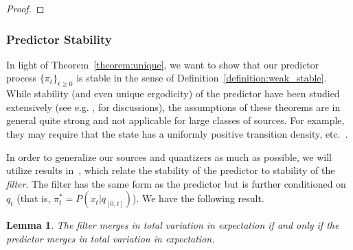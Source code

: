 \documentclass{article}
\newtheorem{lemma}[theorem]{Lemma}
\begin{document}
\begin{proof}


\end{proof}

\subsubsection*{Predictor Stability}
In light of Theorem~\ref{theorem:unique}, we want to show that our predictor process \( \{\pi_t\}_{t\ge0} \) is stable in the sense of Definition~\ref{definition:weak_stable}. While stability (and even unique ergodicity) of the predictor have been studied extensively (see e.g. \cite{Chigansky}, \cite{DM} for discussions), the assumptions of these theorems are in general quite strong and not applicable for large classes of sources. For example, they may require that the state has a uniformly positive transition density, etc.~\cite{Chigansky}.  %

In order to generalize our sources and quantizers as much as possible, we will utilize results in~\cite{Curtis}, which relate the stability of the predictor to stability of the \emph{filter}. The filter has the same form as the predictor but is further conditioned on \( q_t \) (that is, \( \pi_t^* = P(x_t | q_{[0,t]}) \)). We have the following result.

\begin{lemma}\label{lemma:filter-predictor}\cite[Theorem 2.11]{Curtis}
    The filter merges in total variation in expectation if and only if the predictor merges in total variation in expectation.
\end{lemma}
\end{document}
